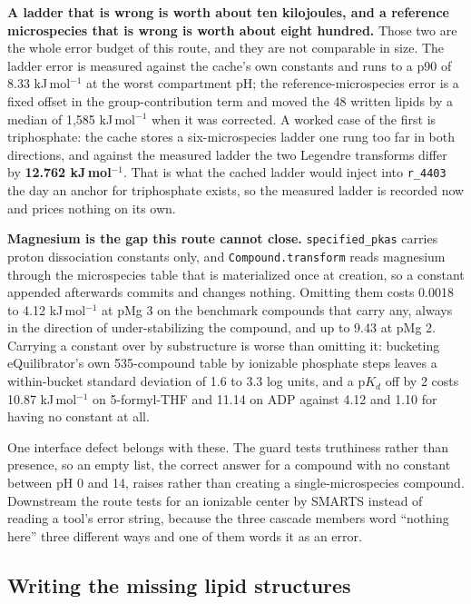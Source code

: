 \textbf{A ladder that is wrong is worth about ten kilojoules, and a reference microspecies
that is wrong is worth about eight hundred.} Those two are the whole error budget of this
route, and they are not comparable in size. The ladder error is measured against the cache's
own constants and runs to a p90 of 8.33 kJ\,mol$^{-1}$ at the worst compartment pH; the
reference-microspecies error is a fixed offset in the group-contribution term and moved the
48 written lipids by a median of 1{,}585 kJ\,mol$^{-1}$ when it was corrected. A worked case
of the first is triphosphate: the cache stores a six-microspecies ladder one rung too far in
both directions, and against the measured ladder the two Legendre transforms differ by
\textbf{12.762 kJ\,mol$^{-1}$}. That is what the cached ladder would inject into
\texttt{r\_4403} the day an anchor for triphosphate exists, so the measured ladder is
recorded now and prices nothing on its own.

\textbf{Magnesium is the gap this route cannot close.} \texttt{specified\_pkas} carries
proton dissociation constants only, and \texttt{Compound.transform} reads magnesium through
the microspecies table that is materialized once at creation, so a constant appended
afterwards commits and changes nothing. Omitting them costs 0.0018 to 4.12 kJ\,mol$^{-1}$ at
pMg 3 on the benchmark compounds that carry any, always in the direction of
under-stabilizing the compound, and up to 9.43 at pMg 2. Carrying a constant over by
substructure is worse than omitting it: bucketing eQuilibrator's own 535-compound table by
ionizable phosphate steps leaves a within-bucket standard deviation of 1.6 to 3.3 log units,
and a p$K_d$ off by 2 costs 10.87 kJ\,mol$^{-1}$ on 5-formyl-THF and 11.14 on ADP against
4.12 and 1.10 for having no constant at all.

One interface defect belongs with these. The guard tests truthiness rather than presence, so
an empty list, the correct answer for a compound with no constant between pH 0 and 14, raises
rather than creating a single-microspecies compound. Downstream the route tests for an
ionizable center by SMARTS instead of reading a tool's error string, because the three
cascade members word ``nothing here'' three different ways and one of them words it as an
error.

\subsection{Writing the missing lipid structures}
\label{sec:lipids}

